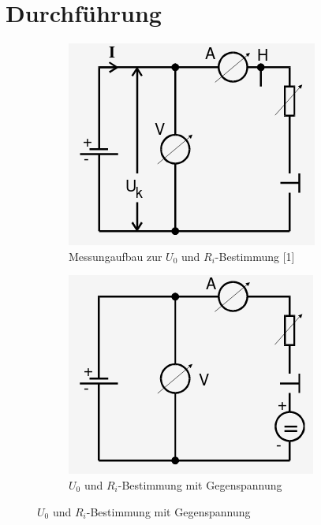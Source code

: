 \section{Durchführung}
\label{sec:Durchführung}




\begin{figure}[H]
    \centering
    \caption{}
    \begin{subfigure}{0.48\textwidth}
      \centering
      \includegraphics[width=\linewidth-60pt,height=\textheight-60pt,keepaspectratio]{content/Spannungsquelle2.png}
      \caption{\footnotesize Messungaufbau zur $U_0$ und $R_i$-Bestimmung [1]}
      \label{fig:Spannung2}
    \end{subfigure}
    \begin{subfigure}{0.48\textwidth}
      \centering
      \includegraphics[width=\linewidth-60pt,height=\textheight-60pt,keepaspectratio]{content/Spannungsquelle3.png}
      \caption{\footnotesize $U_0$ und $R_i $-Bestimmung mit Gegenspannung}
      \label{fig:Spannung3}
    \end{subfigure}
  \end{figure}


